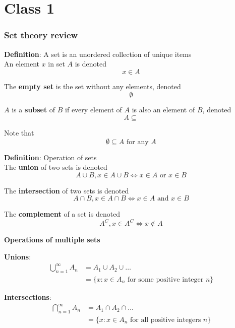 \chapter{Class 1}

\subsection{Set theory review}

\begin{framed} 
   \textbf{Definition}: A set is an unordered collection of unique items  \\

   An element $x$ in set $A$ is denoted 
    \[
     x \in A
   \] 

   The \textbf{empty set} is the set without any elements, denoted
   \[
     \emptyset
   \] 

   $A$ is a \textbf{subset} of $B$ if every element of $A$ is also an element of $B$, denoted
   \[
     A \subseteq 
   \] 

   Note that
   \[
     \emptyset \subseteq A \text{ for any } A
   \] 
\end{framed}

\begin{framed}
   \textbf{Definition}: Operation of sets \\

   The \textbf{union} of two sets is denoted
   \[
     A \cup B, x \in A \cup B \iff x \in A \text{ or } x \in B
   \]

   The \textbf{intersection} of two sets is denoted
   \[
     A \cap B, x \in A \cap B \iff x \in A \text{ and } x \in B
   \]

   The \textbf{complement} of a set is denoted
   \[
     A^C, x \in A^C  \iff x \notin A   \]
\end{framed}


\begin{framed}
  

\textbf{Operations of multiple sets}

   \textbf{Unions}: 
   \begin{align*}
      \bigcup_{n = 1 }^{\infty} A_n &= A_1 \cup A_2 \cup \hdots \\
                                    &= \{ x : x \in A_n \text{ for some positive integer $n$} \} 
   \end{align*}

   \textbf{Intersections}: 
   \begin{align*}
      \bigcap_{n = 1 }^{\infty} A_n &= A_1 \cap A_2 \cap \hdots \\
                                    &= \{ x : x \in A_n \text{ for all positive integers $n$} \} 
   \end{align*}
\end{framed}

